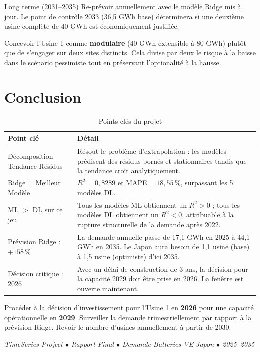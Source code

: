 \documentclass[12pt,a4paper]{article}
\begin{document}
\vspace{0.6em}

\begin{termbox}{Long terme (2031--2035)}
Re-prévoir annuellement avec le modèle Ridge mis à jour. Le point de contrôle 2033
(36,5 GWh base) déterminera si une deuxième usine complète de 40 GWh est
économiquement justifiée.
\end{termbox}

\vspace{0.6em}

\begin{risquebox}
Concevoir l'Usine 1 comme \textbf{modulaire} (40 GWh extensible à 80 GWh) plutôt que
de s'engager sur deux sites distincts. Cela divise par deux le risque à la baisse dans
le scénario pessimiste tout en préservant l'optionalité à la hausse.
\end{risquebox}

\section{Conclusion}

\begin{table}[H]
\centering
\caption{Points clés du projet}
\begin{tabular}{lp{9cm}}
\toprule
\textbf{Point clé} & \textbf{Détail} \\
\midrule
Décomposition Tendance-Résidus
  & Résout le problème d'extrapolation : les modèles prédisent des résidus bornés et
    stationnaires tandis que la tendance croît analytiquement. \\[4pt]
Ridge = Meilleur Modèle
  & $R^2 = 0{,}8289$ et MAPE$= 18{,}55\,\%$, surpassant les 5 modèles DL. \\[4pt]
ML $>$ DL sur ce jeu
  & Tous les modèles ML obtiennent un $R^2 > 0$ ; tous les modèles DL obtiennent un
    $R^2 < 0$, attribuable à la rupture structurelle de la demande après 2022. \\[4pt]
Prévision Ridge : $+158\,\%$
  & La demande annuelle passe de 17,1 GWh en 2025 à 44,1 GWh en 2035. Le Japon aura
    besoin de 1,1 usine (base) à 1,5 usine (optimiste) d'ici 2035. \\[4pt]
Décision critique : 2026
  & Avec un délai de construction de 3 ans, la décision pour la capacité 2029 doit être
    prise en 2026. La fenêtre est ouverte maintenant. \\
\bottomrule
\end{tabular}
\end{table}

\begin{actionbox}
Procéder à la décision d'investissement pour l'Usine 1 en \textbf{2026} pour une capacité
opérationnelle en \textbf{2029}. Surveiller la demande trimestriellement par rapport à la
prévision Ridge. Revoir le nombre d'usines annuellement à partir de 2030.
\end{actionbox}

\vspace{2em}
\begin{center}
\textit{TimeSeries Project $\bullet$ Rapport Final $\bullet$
Demande Batteries VE Japon $\bullet$ 2025--2035}
\end{center}
\end{document}
